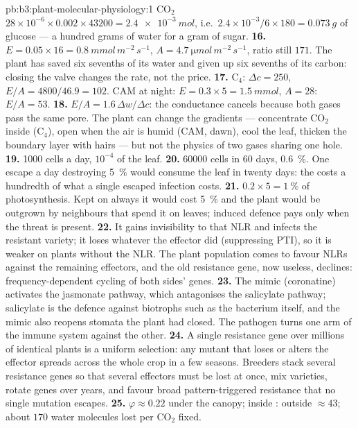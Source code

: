 \begin{solution}{pb:b3:plant-molecular-physiology:1}
CO$_{2}$ $28\times 10^{-6}\times 0.002\times\num{43200} =
\qty{2.4e-3}{mol}$, i.e.\ $2.4\times 10^{-3}/6\times 180 =
\qty{0.073}{g}$ of glucose --- a hundred grams of water for a gram of
sugar.
\textbf{16.} $E = 0.05\times 16 = \qty{0.8}{mmol\,m^{-2}\,s^{-1}}$,
$A = \qty{4.7}{\micro mol\,m^{-2}\,s^{-1}}$, ratio still $171$. The
plant has saved six sevenths of its water and given up six sevenths of
its carbon: closing the valve changes the rate, not the price.
\textbf{17.} C$_{4}$: $\Delta c = 250$, $E/A = 4800/46.9 = 102$. CAM at
night: $E = 0.3\times 5 = \qty{1.5}{mmol}$, $A = 28$: $E/A = 53$.
\textbf{18.} $E/A = 1.6\,\Delta w/\Delta c$: the conductance cancels
because both gases pass the same pore. The plant can change the
gradients --- concentrate CO$_{2}$ inside (C$_{4}$), open when the air is
humid (CAM, dawn), cool the leaf, thicken the boundary layer with hairs
--- but not the physics of two gases sharing one hole.
\textbf{19.} \num{1000} cells a day, $10^{-4}$ of the leaf.
\textbf{20.} \num{60000} cells in 60 days, \qty{0.6}{\%}. One escape a
day destroying \qty{5}{\%} would consume the leaf in twenty days: the
 costs a hundredth of what a single escaped
infection costs.
\textbf{21.} $0.2\times 5 = \qty{1}{\%}$ of photosynthesis. Kept on
always it would cost \qty{5}{\%} and the plant would be outgrown by
neighbours that spend it on leaves; induced defence pays only when the
threat is present.
\textbf{22.} It gains invisibility to that NLR and infects the resistant
variety; it loses whatever the effector did (suppressing PTI), so it
is weaker on plants without the NLR. The plant population comes to
favour NLRs against the remaining effectors, and the old resistance
gene, now useless, declines: frequency-dependent cycling of both sides'
genes.
\textbf{23.} The mimic (coronatine) activates the jasmonate pathway,
which antagonises the salicylate pathway; salicylate is the defence
against biotrophs such as the bacterium itself, and the mimic also
reopens stomata the plant had closed. The pathogen turns one arm of the
immune system against the other.
\textbf{24.} A single resistance gene over millions of identical plants
is a uniform selection: any mutant that loses or alters the effector
spreads across the whole crop in a few seasons. Breeders stack several
resistance genes so that several effectors must be lost at once, mix
varieties, rotate genes over years, and favour broad pattern-triggered
resistance that no single mutation escapes.
\textbf{25.} $\varphi \approx 0.22$ under the canopy;  inside :
outside $\approx 43$; about $170$ water molecules lost per CO$_{2}$
fixed.
\end{solution}
